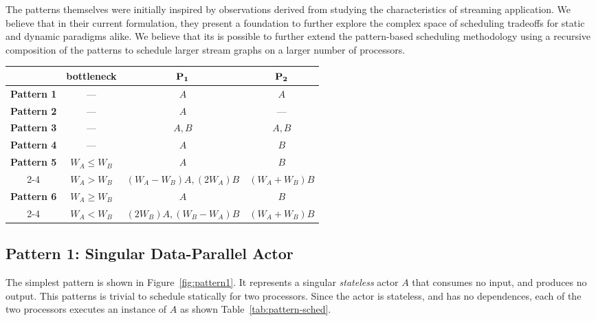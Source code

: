 The patterns themselves were initially inspired by observations
derived from studying the characteristics of streaming application. We
believe that in their current formulation, they present a foundation
to further explore the complex space of scheduling tradeoffs for
static and dynamic paradigms alike.  We believe that its is possible
to further extend the pattern-based scheduling methodology using a
recursive composition of the patterns to schedule larger stream graphs
on a larger number of processors.

\begin{table*}[t]
\center
\caption{\small Maximum efficiency static schedules for the stream graph patterns.}
{\small
\begin{tabular}{|c|c|c|c|} \hline
                 & {\bf bottleneck} & ${\bf P_1}$  & ${\bf P_2}$ \\ \hline
{\bf Pattern 1}  & ---              & $A$     & $A$ \\ \hline
{\bf Pattern 2}  & ---              & $A$     & --- \\ \hline
{\bf Pattern 3}  & ---              & $A, B$  & $A, B$ \\ \hline
{\bf Pattern 4}  & ---              & $A$     & $B$ \\ \hline
{\bf Pattern 5}  & $W_A \le W_B$    & $A$     & $B$ \\ \cline{2-4}
                 & $W_A > W_B$      & $(W_A - W_B) A, (2W_A) B$ & $(W_A + W_B) B$ \\ \hline
{\bf Pattern 6}  & $W_A \ge W_B$    & $A$     & $B$ \\ \cline{2-4}
                 & $W_A < W_B$      & $(2W_B) A, (W_B - W_A) B$ & $(W_A + W_B) B$ \\ \hline
\end{tabular}}
\label{tab:pattern-sched}
\end{table*}


\subsection{Pattern 1: Singular Data-Parallel Actor}

The simplest pattern is shown in Figure~\ref{fig:pattern1}. It
represents a singular {\it stateless} actor $A$ that consumes no
input, and produces no output.
This patterns is trivial to schedule statically for two
processors. Since the actor is stateless, and has no dependences, each
of the two processors executes an instance of $A$ as shown Table~\ref{tab:pattern-sched}.

